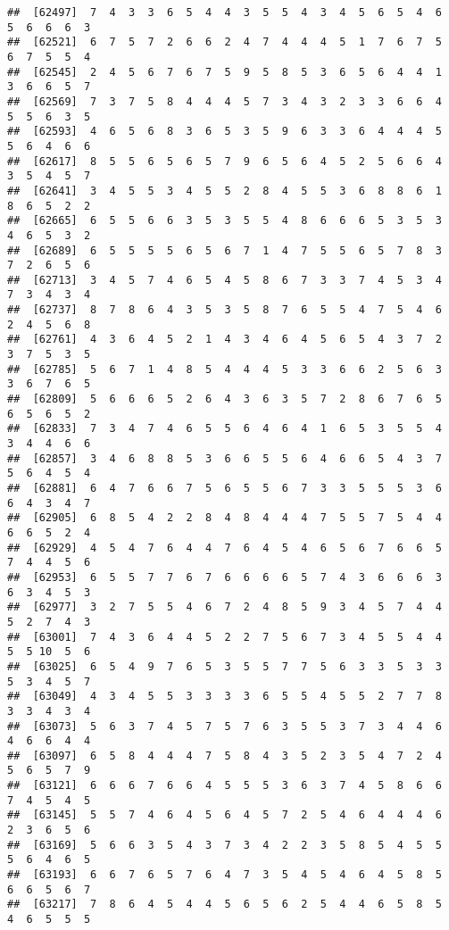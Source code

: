 \documentclass[
]{book}
\begin{document}
\begin{verbatim}
##  [62497]  7  4  3  3  6  5  4  4  3  5  5  4  3  4  5  6  5  4  6  5  6  6  6  3
##  [62521]  6  7  5  7  2  6  6  2  4  7  4  4  4  5  1  7  6  7  5  6  7  5  5  4
##  [62545]  2  4  5  6  7  6  7  5  9  5  8  5  3  6  5  6  4  4  1  3  6  6  5  7
##  [62569]  7  3  7  5  8  4  4  4  5  7  3  4  3  2  3  3  6  6  4  5  5  6  3  5
##  [62593]  4  6  5  6  8  3  6  5  3  5  9  6  3  3  6  4  4  4  5  5  6  4  6  6
##  [62617]  8  5  5  6  5  6  5  7  9  6  5  6  4  5  2  5  6  6  4  3  5  4  5  7
##  [62641]  3  4  5  5  3  4  5  5  2  8  4  5  5  3  6  8  8  6  1  8  6  5  2  2
##  [62665]  6  5  5  6  6  3  5  3  5  5  4  8  6  6  6  5  3  5  3  4  6  5  3  2
##  [62689]  6  5  5  5  5  6  5  6  7  1  4  7  5  5  6  5  7  8  3  7  2  6  5  6
##  [62713]  3  4  5  7  4  6  5  4  5  8  6  7  3  3  7  4  5  3  4  7  3  4  3  4
##  [62737]  8  7  8  6  4  3  5  3  5  8  7  6  5  5  4  7  5  4  6  2  4  5  6  8
##  [62761]  4  3  6  4  5  2  1  4  3  4  6  4  5  6  5  4  3  7  2  3  7  5  3  5
##  [62785]  5  6  7  1  4  8  5  4  4  4  5  3  3  6  6  2  5  6  3  3  6  7  6  5
##  [62809]  5  6  6  6  5  2  6  4  3  6  3  5  7  2  8  6  7  6  5  6  5  6  5  2
##  [62833]  7  3  4  7  4  6  5  5  6  4  6  4  1  6  5  3  5  5  4  3  4  4  6  6
##  [62857]  3  4  6  8  8  5  3  6  6  5  5  6  4  6  6  5  4  3  7  5  6  4  5  4
##  [62881]  6  4  7  6  6  7  5  6  5  5  6  7  3  3  5  5  5  3  6  6  4  3  4  7
##  [62905]  6  8  5  4  2  2  8  4  8  4  4  4  7  5  5  7  5  4  4  6  6  5  2  4
##  [62929]  4  5  4  7  6  4  4  7  6  4  5  4  6  5  6  7  6  6  5  7  4  4  5  6
##  [62953]  6  5  5  7  7  6  7  6  6  6  6  5  7  4  3  6  6  6  3  6  3  4  5  3
##  [62977]  3  2  7  5  5  4  6  7  2  4  8  5  9  3  4  5  7  4  4  5  2  7  4  3
##  [63001]  7  4  3  6  4  4  5  2  2  7  5  6  7  3  4  5  5  4  4  5  5 10  5  6
##  [63025]  6  5  4  9  7  6  5  3  5  5  7  7  5  6  3  3  5  3  3  5  3  4  5  7
##  [63049]  4  3  4  5  5  3  3  3  3  6  5  5  4  5  5  2  7  7  8  3  3  4  3  4
##  [63073]  5  6  3  7  4  5  7  5  7  6  3  5  5  3  7  3  4  4  6  4  6  6  4  4
##  [63097]  6  5  8  4  4  4  7  5  8  4  3  5  2  3  5  4  7  2  4  5  6  5  7  9
##  [63121]  6  6  6  7  6  6  4  5  5  5  3  6  3  7  4  5  8  6  6  7  4  5  4  5
##  [63145]  5  5  7  4  6  4  5  6  4  5  7  2  5  4  6  4  4  4  6  2  3  6  5  6
##  [63169]  5  6  6  3  5  4  3  7  3  4  2  2  3  5  8  5  4  5  5  5  6  4  6  5
##  [63193]  6  6  7  6  5  7  6  4  7  3  5  4  5  4  6  4  5  8  5  6  6  5  6  7
##  [63217]  7  8  6  4  5  4  4  5  6  5  6  2  5  4  4  6  5  8  5  4  6  5  5  5

\end{verbatim}
\end{document}
